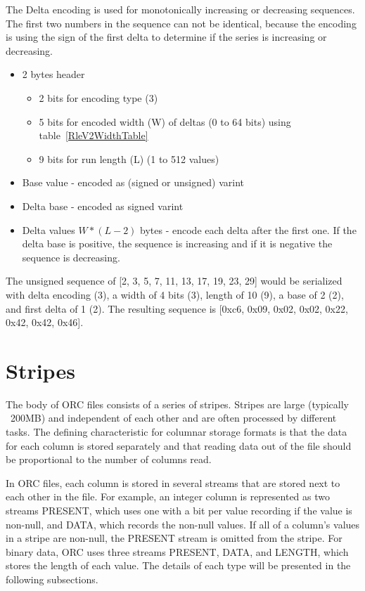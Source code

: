 \documentclass{article}
\begin{document}
The Delta encoding is used for monotonically increasing or decreasing
sequences. The first two numbers in the sequence can not be identical,
because the encoding is using the sign of the first delta to determine
if the series is increasing or decreasing.

\begin{itemize}
\item 2 bytes header
  \begin{itemize}
  \item 2 bits for encoding type (3)
  \item 5 bits for encoded width (W) of deltas (0 to 64 bits)
        using table~\ref{RleV2WidthTable}
  \item 9 bits for run length (L) (1 to 512 values)
  \end{itemize}
\item Base value - encoded as (signed or unsigned) varint
\item Delta base - encoded as signed varint
\item Delta values $W * (L - 2)$ bytes - encode each delta after the first
  one. If the delta base is positive, the sequence is increasing and if it is
  negative the sequence is decreasing.
\end{itemize}

The unsigned sequence of [2, 3, 5, 7, 11, 13, 17, 19, 23, 29] would be
serialized with delta encoding (3), a width of 4 bits (3), length of
10 (9), a base of 2 (2), and first delta of 1 (2). The resulting
sequence is [0xc6, 0x09, 0x02, 0x02, 0x22, 0x42, 0x42, 0x46].

\section{Stripes}

The body of ORC files consists of a series of stripes. Stripes are
large (typically ~200MB) and independent of each other and are often
processed by different tasks. The defining characteristic for columnar
storage formats is that the data for each column is stored separately
and that reading data out of the file should be proportional to the
number of columns read.

In ORC files, each column is stored in several streams that are stored
next to each other in the file. For example, an integer column is
represented as two streams PRESENT, which uses one with a bit per
value recording if the value is non-null, and DATA, which records the
non-null values. If all of a column's values in a stripe are non-null,
the PRESENT stream is omitted from the stripe. For binary data, ORC
uses three streams PRESENT, DATA, and LENGTH, which stores the length
of each value. The details of each type will be presented in the
following subsections.
\end{document}
